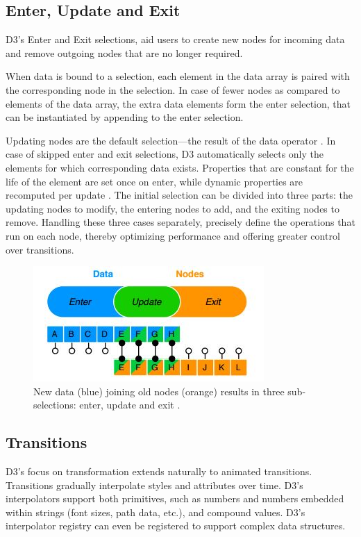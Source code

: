 \documentclass[9pt,twocolumn,twoside]{../../styles/osajnl}
\begin{document}
\subsection{Enter, Update and Exit}
D3’s Enter and Exit selections, aid users to create new nodes for incoming data and remove outgoing nodes that are no longer required.

When data is bound to a selection, each element in the data array is paired with the corresponding node in the selection. In case of fewer nodes as compared to elements of the data array, the extra data elements form the enter selection, that can be instantiated by appending to the enter selection.

Updating nodes are the default selection—the result of the data operator \cite{www-d3}. In case of skipped enter and exit selections, D3 automatically selects only the elements for which corresponding data exists. Properties that are constant for the life of the element are set once on enter, while dynamic properties are recomputed per update \cite{paper-d3}. The initial selection can be divided into three parts: the updating nodes to modify, the entering nodes to add, and the exiting nodes to remove. Handling these three cases separately, precisely define the operations that run on each node, thereby optimizing performance and offering greater control over transitions.


\begin{figure}[h]
\centering
\includegraphics[scale=0.8]{images/5}
\centering
\caption{New data (blue) joining old nodes (orange) results in three sub-selections: enter, update and exit \cite{www-d3}.}
\end{figure}

\subsection{Transitions}
D3’s focus on transformation extends naturally to animated transitions. Transitions gradually interpolate styles and attributes over time. D3’s interpolators support both primitives, such as numbers and numbers embedded within strings (font sizes, path data, etc.), and compound values. D3’s interpolator registry can even be registered to support complex data structures.
\end{document}
